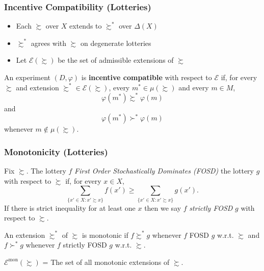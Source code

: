 \begin{frame}
  \frametitle{Incentive Compatibility (Lotteries)}

\begin{itemize}
    \item Each $\succsim$ over $X$ extends to $\succsim^*$ over $\Delta(X)$
    \item $\succsim^*$ agrees with $\succsim$ on degenerate lotteries
    \item Let $\mathcal{E}(\succsim)$ be the set of admissible extensions of $\succsim$
\end{itemize}

\bigskip

\begin{definition}
    An experiment $(D,\varphi)$ is \textbf{incentive compatible} with respect to $\mathcal{E}$ if, for every $\succsim$ and extension $\succsim^*\in \mathcal{E}(\succsim)$, every $m^*\in \mu(\succsim)$ and every $m\in M$,
    $$
        \varphi(m^*)\succsim^* \varphi(m)
    $$
   and
    $$
        \varphi(m^*)\succ^* \varphi(m)
    $$
    whenever $m\not\in \mu(\succsim)$.
\end{definition}

%

\end{frame}



\begin{frame}
  \frametitle{Monotonicity (Lotteries)}

\begin{definition}
Fix $\succsim$. The lottery $f$ \emph{First Order Stochastically Dominates (FOSD)} the lottery $g$ with respect to $\succsim$ if, for every $x\in X$,
$$\sum_{\{x'\in X:x'\succsim x\}}f(x')\geq \sum_{\{x'\in X:x'\succsim x\}}g(x').$$
If there is strict inequality for at least one $x$ then we say $f$ \emph{strictly FOSD} $g$ with respect to $\succsim$.
\end{definition}

\begin{definition}
An extension $\succsim^*$ of $\succsim$ is monotonic if $f \succsim^* g$ whenever $f$ FOSD $g$ w.r.t. $\succsim$ and $f \succ^* g$ whenever $f$ strictly FOSD $g$ w.r.t. $\succsim$.
\end{definition}

\bigskip

$\mathcal{E}^\mathrm{mon}(\succsim)$ = The set of all monotonic extensions of $\succsim$.


\end{frame}

